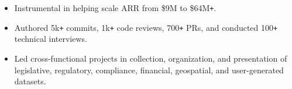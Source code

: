 \documentclass[]{article}
\def\Plus{\texttt{+}}
\begin{document}
\begin{minipage}[t]{0.48\linewidth}
    \begin{itemize}
		\item Instrumental in helping scale ARR from \$9M to \$64M{\Plus}.
		\item Authored 5k{\Plus} commits, 1k{\Plus} code reviews, 700{\Plus} PRs, and conducted 100{\Plus} technical interviews.
    \end{itemize}

\end{minipage}
\hfill
\begin{minipage}[t]{0.48\linewidth}
    \begin{itemize}
		\item Led cross-functional projects in collection, organization, and presentation of legislative, regulatory, compliance, financial, geospatial, and user-generated datasets.
    \end{itemize}
\end{minipage}
\end{document}

